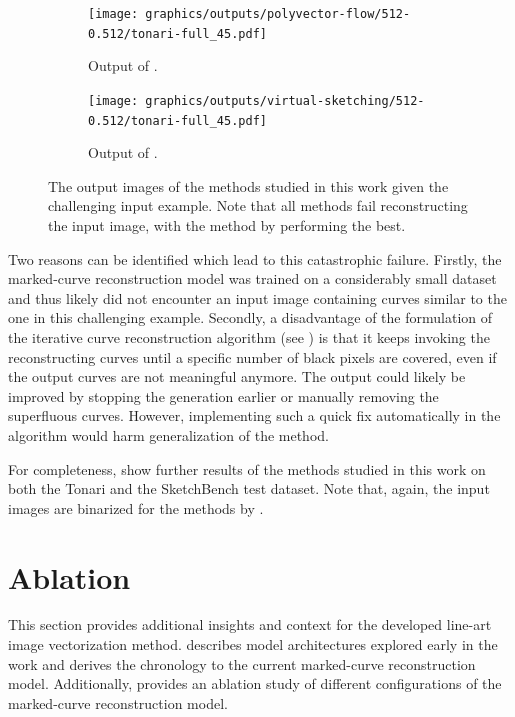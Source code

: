 \begin{figure}
\begin{subfigure}{.49\textwidth}
    \end{subfigure}
    \begin{subfigure}{.49\textwidth}
    \texttt{[image: graphics/outputs/polyvector-flow/512-0.512/tonari-full\_45.pdf]}
    \caption{Output of \citet{Puhachov2021KeypointPolyvector}.}
    \end{subfigure}
    \begin{subfigure}{.49\textwidth}
    \texttt{[image: graphics/outputs/virtual-sketching/512-0.512/tonari-full\_45.pdf]}
    \caption{Output of \citet{mo2021virtualsketching}.}
    \end{subfigure}
    \caption{The output images of the methods studied in this work given the challenging input example. Note that all methods fail reconstructing the input image, with the method by \citet{mo2021virtualsketching} performing the best.}
    \label{fig:tonari-full_45}
\end{figure}

Two reasons can be identified which lead to this catastrophic failure. Firstly, the marked-curve reconstruction model was trained on a considerably small dataset and thus likely did not encounter an input image containing curves similar to the one in this challenging example. Secondly, a disadvantage of the formulation of the iterative curve reconstruction algorithm (see ) is that it keeps invoking the reconstructing curves until a specific number of black pixels are covered, even if the output curves are not meaningful anymore. The output could likely be improved by stopping the generation earlier or manually removing the superfluous curves. However, implementing such a quick fix automatically in the algorithm would harm generalization of the method.


For completeness,  show further results of the methods studied in this work on both the Tonari and the SketchBench test dataset. Note that, again, the input images are binarized for the methods by \citet{Puhachov2021KeypointPolyvector,autotrace,mo2021virtualsketching}.

\clearpage

\section{Ablation}
\label{sec:ablation}

This section provides additional insights and context for the developed line-art image vectorization method.  describes model architectures explored early in the work and derives the chronology to the current marked-curve reconstruction model. Additionally,  provides an ablation study of different configurations of the marked-curve reconstruction model.

